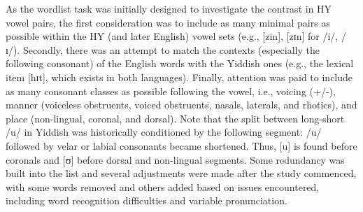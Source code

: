 \documentclass[output=paper]{langsci/langscibook}
\begin{document}
\label{sec:nove:appendix}

As the wordlist task was initially designed to investigate the contrast in HY vowel pairs, the first consideration was to include as many minimal pairs as possible within the HY (and later English) vowel sets (e.g., {[}zin{]}, {[}zɪn{]} for {/i/, /ɪ/}). Secondly, there was an attempt to match the contexts (especially the following consonant) of the English words with the Yiddish ones (e.g., the lexical item {[}hɪt{]}, which exists in both languages). Finally, attention was paid to include as many consonant classes as possible following the vowel, i.e., voicing (+/-), manner (voiceless obstruents, voiced obstruents, nasals, laterals, and rhotics), and place (non-lingual, coronal, and dorsal). Note that the split between long-short /u/ in Yiddish was historically conditioned by the following segment: /u/ followed by velar or labial consonants became shortened. Thus, {[}u{]} is found before coronals and {[}ʊ{]} before dorsal and non-lingual segments. 
Some redundancy was built into the list and several adjustments were made after the study commenced, with some words removed and others added based on issues encountered, including word recognition difficulties and variable pronunciation.


\begin{table}[h]
\end{table}

{\sloppy\printbibliography[heading=subbibliography,notkeyword=this]}
\end{document}
